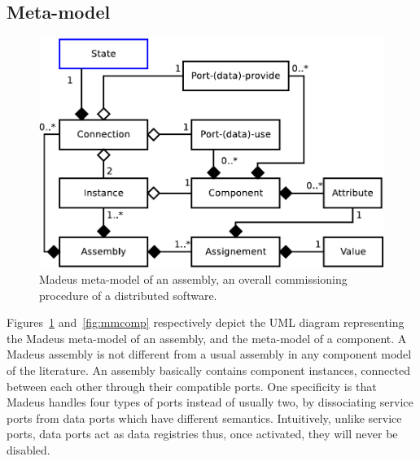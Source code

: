 \subsection{Meta-model}


\begin{figure}[tbp]
  \begin{center}
    \includegraphics[width=0.9\linewidth]{./images/ass_uml.pdf}
  \end{center}
  \caption{Madeus meta-model of an assembly, \ie an overall
    commissioning procedure of a distributed software.}
  \label{fig:mmass}
\end{figure}

Figures~\ref{fig:mmass} and~\ref{fig:mmcomp} respectively depict the
UML diagram representing the Madeus meta-model of an assembly, and the
meta-model of a component. A Madeus assembly is not different from a
usual assembly in any component model of the literature. An assembly
basically contains component instances, connected between each other
through their compatible ports. One specificity is that Madeus handles
four types of ports instead of usually two, by dissociating service
ports from data ports which have different semantics. Intuitively,
unlike service ports, data ports act as data registries thus, once
activated, they will never be disabled.

